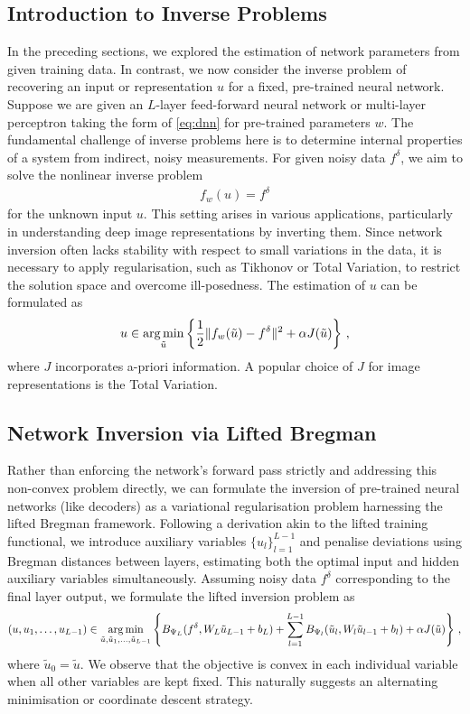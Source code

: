 \subsection{Introduction to Inverse Problems}
In the preceding sections, we explored the estimation of network parameters from given training data. In contrast, we now consider the inverse problem of recovering an input or representation $u$ for a fixed, pre-trained neural network.
Suppose we are given an $L$-layer feed-forward neural network or multi-layer perceptron taking the form of \eqref{eq:dnn} for pre-trained parameters $w$. The fundamental challenge of inverse problems here is to determine internal properties of a system from indirect, noisy measurements. For given noisy data $f^\delta$, we aim to solve the nonlinear inverse problem
\begin{align*}
    f_w(u) = f^\delta
\end{align*}
for the unknown input $u$. This setting arises in various applications, particularly in understanding deep image representations by inverting them. Since network inversion often lacks stability with respect to small variations in the data, it is necessary to apply regularisation, such as Tikhonov or Total Variation, to restrict the solution space and overcome ill-posedness. The estimation of $u$ can be formulated as
\begin{align*}
    u \in \operatorname*{arg\,min}_{\tilde{u}} \left\{ \frac12 \| f_w(\tilde{u}) - f^\delta \|^2 + \alpha J(\tilde{u}) \right\} \, ,
\end{align*}
where $J$ incorporates a-priori information. A popular choice of $J$ for image representations is the Total Variation.

\subsection{Network Inversion via Lifted Bregman}
Rather than enforcing the network's forward pass strictly and addressing this non-convex problem directly, we can formulate the inversion of pre-trained neural networks (like decoders) as a variational regularisation problem harnessing the lifted Bregman framework. Following a derivation akin to the lifted training functional, we introduce auxiliary variables $\{ u_l \}_{l=1}^{L-1}$ and penalise deviations using Bregman distances between layers, estimating both the optimal input and hidden auxiliary variables simultaneously. Assuming noisy data $f^\delta$ corresponding to the final layer output, we formulate the lifted inversion problem as
\begin{align}
    \left( u, u_1, \ldots, u_{L - 1} \right) \in \operatorname*{arg\,min}_{\tilde{u}, \tilde{u}_1, \ldots, \tilde{u}_{L - 1}} \left\{ B_{\Psi_L}(f^\delta, W_L \tilde{u}_{L - 1} + b_L) + \sum_{l = 1}^{L - 1} B_{\Psi_l}(\tilde{u}_l, W_l \tilde{u}_{l - 1} + b_l) + \alpha J(\tilde{u}) \right\} \, , \label{eq:lifted_inversion}
\end{align}
where $\tilde{u}_0 = \tilde{u}$. We observe that the objective is convex in each individual variable when all other variables are kept fixed. This naturally suggests an alternating minimisation or coordinate descent strategy.

